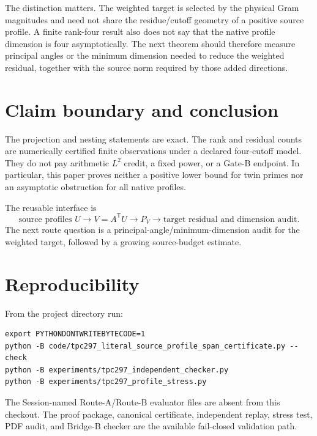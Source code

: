 \documentclass[10pt]{article}
\begin{document}
The distinction matters.  The weighted target is selected by the physical
Gram magnitudes and need not share the residue/cutoff geometry of a positive
source profile.  A finite rank-four result also does not say that the native
profile dimension is four asymptotically.  The next theorem should therefore
measure principal angles or the minimum dimension needed to reduce the
weighted residual, together with the source norm required by those added
directions.

\section{Claim boundary and conclusion}

The projection and nesting statements are exact.  The rank and residual
counts are numerically certified finite observations under a declared
four-cutoff model.  They do not pay arithmetic $L^2$ credit, a fixed power,
or a Gate-B endpoint.  In particular, this paper proves neither a positive
lower bound for twin primes nor an asymptotic obstruction for all native
profiles.

The reusable interface is
\[
 \text{source profiles }U
 \longrightarrow V=A^{\mathsf T}U
 \longrightarrow P_V
 \longrightarrow \text{target residual and dimension audit}.
\]
The next route question is a principal-angle/minimum-dimension audit for the
weighted target, followed by a growing source-budget estimate.

\section*{Reproducibility}

From the project directory run:
\begin{verbatim}
export PYTHONDONTWRITEBYTECODE=1
python -B code/tpc297_literal_source_profile_span_certificate.py --check
python -B experiments/tpc297_independent_checker.py
python -B experiments/tpc297_profile_stress.py
\end{verbatim}
The Session-named Route-A/Route-B evaluator files are absent from this
checkout.  The proof package, canonical certificate, independent replay,
stress test, PDF audit, and Bridge-B checker are the available fail-closed
validation path.



\end{document}
